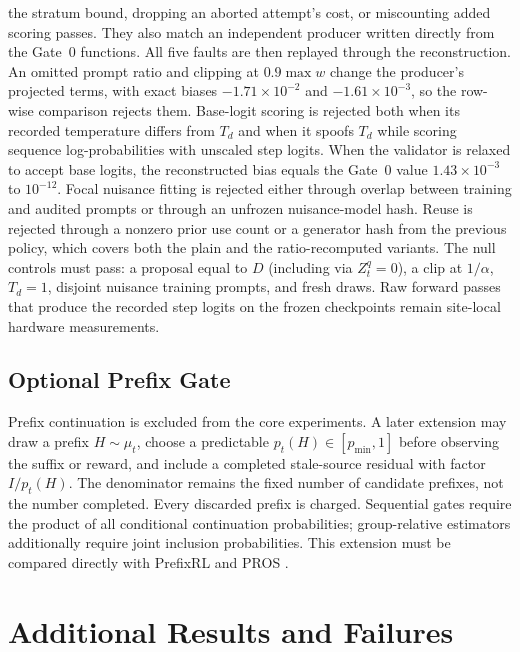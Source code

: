\documentclass{article}
\begin{document}
the stratum bound, dropping an aborted attempt's cost, or miscounting added
scoring passes. They also match an
independent producer written directly from the Gate~0 functions. All five
faults are then replayed through the reconstruction. An omitted prompt ratio
and clipping at $0.9\max w$ change the producer's projected terms, with
exact biases $-1.71\times10^{-2}$ and $-1.61\times10^{-3}$, so the row-wise
comparison rejects them. Base-logit scoring is rejected both when its recorded
temperature differs from $T_d$ and when it spoofs $T_d$ while scoring sequence
log-probabilities with unscaled step logits. When the validator is relaxed to
accept base logits, the reconstructed bias equals the Gate~0 value
$1.43\times10^{-3}$ to $10^{-12}$. Focal nuisance fitting is rejected either
through overlap between training and audited prompts or through an unfrozen
nuisance-model hash. Reuse is rejected through a nonzero prior use count or a
generator hash from the previous policy, which covers both the plain and the
ratio-recomputed variants. The null controls must pass: a proposal equal to $D$
(including via $Z_t^q=0$), a clip at $1/\alpha$, $T_d=1$, disjoint nuisance
training prompts, and fresh draws. Raw forward passes that produce the recorded
step logits on the frozen checkpoints remain site-local hardware measurements.

\subsection{Optional Prefix Gate}
Prefix continuation is excluded from the core experiments. A later extension
may draw a prefix $H\sim\mu_t$, choose a predictable
$p_t(H)\in[p_{\min},1]$ before observing the suffix or reward, and include a
completed stale-source residual with factor $I/p_t(H)$. The denominator remains
the fixed number of candidate prefixes, not the number completed. Every
discarded prefix is charged. Sequential gates require the product of all
conditional continuation probabilities; group-relative estimators additionally
require joint inclusion probabilities. This extension must be compared
directly with PrefixRL and PROS \cite{setlur2026prefixrl,huang2026pros}.

\section{Additional Results and Failures}
\label{app:additional}
\end{document}
